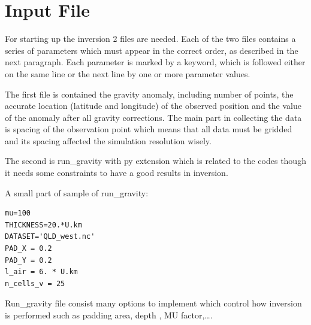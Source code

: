 \section{Input File} 

For starting up the inversion 2 files are needed. Each of the 
two files contains a series of parameters which must appear in the correct order, as described in 
the next paragraph. Each parameter is marked by a keyword, which is followed either on the same line 
or the next line by one or more parameter values. 

The first file is contained the gravity anomaly, including number of points, the accurate location
(latitude and longitude) of the observed position and the value of the anomaly after all gravity corrections. 
The main part in collecting the data is spacing of the observation point which means that all data must be gridded and 
its spacing affected the simulation resolution wisely.

The second is run_gravity with py extension which is related to the codes though 
it needs some constraints to have a good results in inversion.

A small part of sample of run_gravity:

\begin{verbatim}
mu=100
THICKNESS=20.*U.km
DATASET='QLD_west.nc'
PAD_X = 0.2
PAD_Y = 0.2
l_air = 6. * U.km
n_cells_v = 25
\end{verbatim}

Run_gravity file consist many options to implement which control how inversion is performed such as padding area, depth , MU factor,\ldots.

